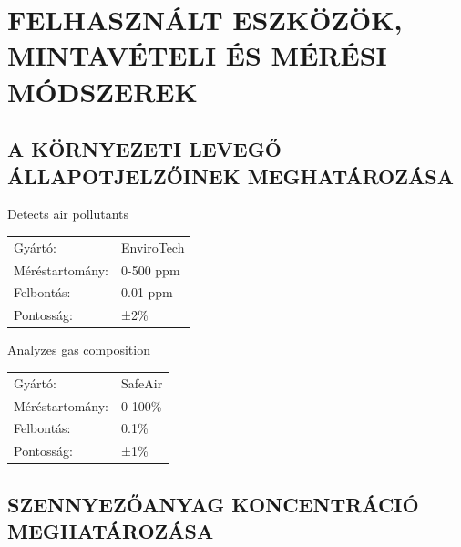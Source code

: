 \documentclass[a4paper,12pt]{article}
\begin{document}
	
	\newpage
	\section{FELHASZNÁLT ESZKÖZÖK, MINTAVÉTELI ÉS MÉRÉSI MÓDSZEREK}
	\subsection{A KÖRNYEZETI LEVEGŐ ÁLLAPOTJELZŐINEK MEGHATÁROZÁSA}

		\begin{adjustwidth}{1cm}{0cm}

	\vspace{1.0em}	Detects air pollutants

	\vspace{1.0em}	\noindent
	\centering
	\begin{tabular}{ p{5.5cm} p{8cm} }
		Gyártó: & EnviroTech \\
		Méréstartomány: & 0-500 ppm \\
		Felbontás: & 0.01 ppm \\
		Pontosság: & ±2\% \\
	\end{tabular}
\end{adjustwidth}
\begin{adjustwidth}{1cm}{0cm}

	\vspace{1.0em}	Analyzes gas composition

	\vspace{1.0em}	\noindent
	\centering
	\begin{tabular}{ p{5.5cm} p{8cm} }
		Gyártó: & SafeAir \\
		Méréstartomány: & 0-100\% \\
		Felbontás: & 0.1\% \\
		Pontosság: & ±1\% \\
	\end{tabular}
\end{adjustwidth}


	\subsection{SZENNYEZŐANYAG KONCENTRÁCIÓ MEGHATÁROZÁSA}
	
\end{document}
